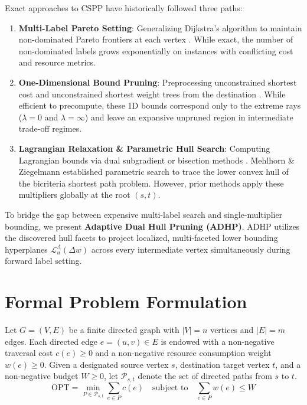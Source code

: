 \documentclass[11pt,a4paper]{article}
\begin{document}
Exact approaches to CSPP have historically followed three paths:
\begin{enumerate}
    \item \textbf{Multi-Label Pareto Setting}: Generalizing Dijkstra's algorithm to maintain non-dominated Pareto frontiers at each vertex \cite{martins1984multicriteria}. While exact, the number of non-dominated labels grows exponentially on instances with conflicting cost and resource metrics.
    \item \textbf{One-Dimensional Bound Pruning}: Preprocessing unconstrained shortest cost and unconstrained shortest weight trees from the destination \cite{dumitrescu2003improved, lozano2013exact}. While efficient to precompute, these 1D bounds correspond only to the extreme rays ($\lambda = 0$ and $\lambda = \infty$) and leave an expansive unpruned region in intermediate trade-off regimes.
    \item \textbf{Lagrangian Relaxation \& Parametric Hull Search}: Computing Lagrangian bounds via dual subgradient or bisection methods \cite{handler1980dual, carlyle2008lagrangian, mehlhorn2000resource}. Mehlhorn \& Ziegelmann \cite{mehlhorn2000resource} established parametric search to trace the lower convex hull of the bicriteria shortest path problem. However, prior methods apply these multipliers globally at the root $(s, t)$.
\end{enumerate}

To bridge the gap between expensive multi-label search and single-multiplier bounding, we present \textbf{Adaptive Dual Hull Pruning (ADHP)}. ADHP utilizes the discovered hull facets to project localized, multi-faceted lower bounding hyperplanes $\mathcal{L}_u^\Lambda(\Delta w)$ across every intermediate vertex simultaneously during forward label setting.

\section{Formal Problem Formulation}
Let $G = (V, E)$ be a finite directed graph with $|V| = n$ vertices and $|E| = m$ edges. Each directed edge $e = (u, v) \in E$ is endowed with a non-negative traversal cost $c(e) \ge 0$ and a non-negative resource consumption weight $w(e) \ge 0$. Given a designated source vertex $s$, destination target vertex $t$, and a non-negative budget $W \ge 0$, let $\mathcal{P}_{s, t}$ denote the set of directed paths from $s$ to $t$.
\begin{equation}
\text{OPT} = \min_{P \in \mathcal{P}_{s, t}} \sum_{e \in P} c(e) \quad \text{subject to} \quad \sum_{e \in P} w(e) \le W
\end{equation}
\end{document}

